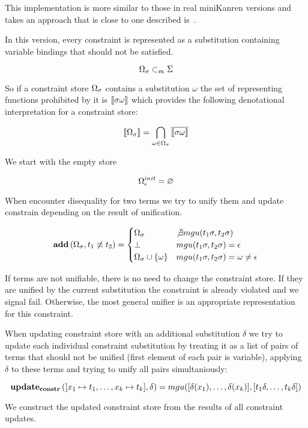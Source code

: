 This implementation is more similar to those in real miniKanren versions and takes an approach that is close to one described is~\cite{CKanren}.

In this version, every constraint is represented as a substitution containing variable bindings that should not be satisfied.

\[ \Omega_\sigma \subset_m \Sigma \]

So if a constraint store $\Omega_\sigma$ contains a substitution $\omega$ the set of representing functions prohibited by it is $\llbracket{\sigma \omega}\rrbracket$
which provides the following denotational interpretation for a constraint store:

\[ \llbracket{\Omega_\sigma}\rrbracket = \bigcap_{\omega \in \Omega_\sigma} \overline{ \llbracket{\sigma \omega}\rrbracket } \]

We start with the empty store

\[ \Omega_\epsilon^{init} = \varnothing \]

When encounter disequality for two terms we try to unify them and update constrain depending on the result of unification.

\[
\mathbf{add}\,(\Omega_\sigma, t_1 \not\equiv t_2) =
    \begin{cases}
       \Omega_\sigma                                & \not\exists mgu(t_1 \sigma, t_2 \sigma) \\
       \bot                                                 & mgu(t_1 \sigma, t_2 \sigma) = \epsilon \\
       \Omega_\sigma \cup \{\omega\}      & mgu(t_1 \sigma, t_2 \sigma) = \omega \neq \epsilon
    \end{cases}
\]

If terms are not unifiable, there is no need to change the constraint store.
If they are unified by the current substitution the constraint is already violated and we signal fail.
Otherwise, the most general unifier is an appropriate representation for this constraint.

When updating constraint store with an additional substitution $\delta$ we try to update each individual constraint substitution by treating it
as a list of pairs of terms that should not be unified (first element of each pair is variable),
applying $\delta$ to these terms and trying to unify all pairs simultaniously:

\[ \mathbf{update_{constr}}\,([x_1 \mapsto t_1, \dots, x_k \mapsto t_k], \delta) = mgu([\delta(x_1), \dots, \delta(x_k)],[t_1 \delta, \dots, t_k \delta]) \]

We construct the updated constraint store from the results of all constraint updates.


